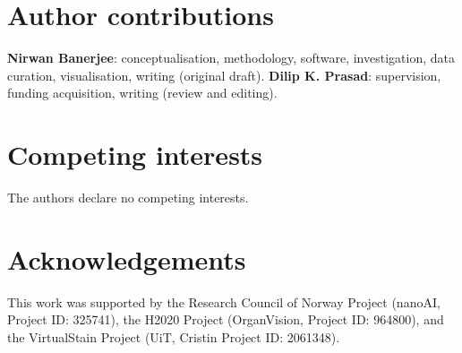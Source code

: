 \documentclass[10pt,a4paper]{article}
\begin{document}
\section*{Author contributions}

\textbf{Nirwan Banerjee}: conceptualisation, methodology, software,
investigation, data curation, visualisation, writing (original draft).
\textbf{Dilip K. Prasad}: supervision, funding acquisition, writing (review
and editing).

\section*{Competing interests}
The authors declare no competing interests.

\section*{Acknowledgements}
This work was supported by the Research Council of Norway Project (nanoAI,
Project ID: 325741), the H2020 Project (OrganVision, Project ID: 964800),
and the VirtualStain Project (UiT, Cristin Project ID: 2061348).




\end{document}
